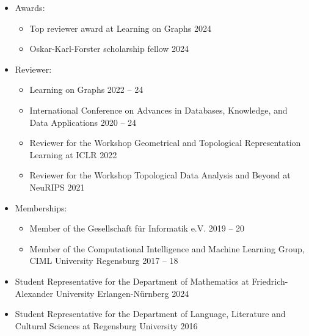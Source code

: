 \documentclass[a4paper, 11pt]{article}
\newcommand{\years}[1]{\marginnote{\scriptsize #1}}
\begin{document}
\years{Service}
\vspace{-10pt}
\begin{itemize}[noitemsep, leftmargin=*]
	\item Awards:
		\begin{itemize}[noitemsep, leftmargin=*]
			\item Top reviewer award at Learning on Graphs 2024
			\item Oskar-Karl-Forster scholarship fellow 2024
		\end{itemize}
	\item Reviewer:
		\begin{itemize}[noitemsep, leftmargin=*]
			\item Learning on Graphs 2022 -- 24
			\item International Conference on Advances in Databases, Knowledge, and Data Applications 2020 -- 24
			\item Reviewer for the Workshop Geometrical and Topological Representation Learning at ICLR 2022
			\item Reviewer for the Workshop Topological Data Analysis and Beyond at NeuRIPS 2021
		\end{itemize}
	\item Memberships:
		\begin{itemize}[noitemsep, leftmargin=*]
			\item Member of the Gesellschaft für Informatik e.V. 2019 -- 20
			\item Member of the Computational Intelligence and Machine Learning Group, CIML University Regensburg 2017 -- 18
		\end{itemize}
	\item Student Representative for the Department of Mathematics at Friedrich-Alexander University Erlangen-Nürnberg 2024
	\item Student Representative for the Department of Language, Literature and Cultural Sciences at Regensburg University 2016
\end{itemize}
\vspace{10pt}

\newpage
\end{document}
